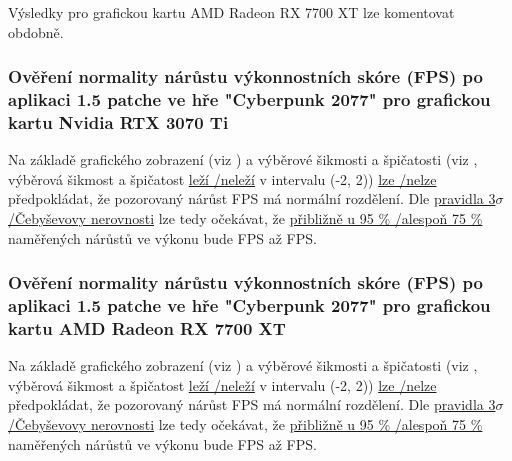 \vspace{1em}
\noindent
Výsledky pro grafickou kartu AMD Radeon RX 7700 XT lze komentovat obdobně.

\subsubsection*{Ověření normality nárůstu výkonnostních skóre (FPS) po aplikaci 1.5 patche ve hře "Cyberpunk 2077" pro grafickou kartu Nvidia RTX 3070 Ti}

Na základě grafického zobrazení (viz \TODO) a výběrové šikmosti a špičatosti (viz , výběrová šikmost a špičatost \ul{leží \slash neleží}
v intervalu (-2, 2)) \ul{lze \slash nelze} předpokládat, že pozorovaný nárůst FPS má normální rozdělení. Dle \ul{pravidla 3$\sigma$ \slash Čebyševovy nerovnosti}
lze tedy očekávat, že \ul{přibližně u 95 \% \slash alespoň 75 \%} naměřených nárůstů ve výkonu bude  FPS až  FPS\@.

\subsubsection*{Ověření normality nárůstu výkonnostních skóre (FPS) po aplikaci 1.5 patche ve hře "Cyberpunk 2077" pro grafickou kartu AMD Radeon RX 7700 XT}

Na základě grafického zobrazení (viz \TODO) a výběrové šikmosti a špičatosti (viz , výběrová šikmost a špičatost \ul{leží \slash neleží}
v intervalu (-2, 2)) \ul{lze \slash nelze} předpokládat, že pozorovaný nárůst FPS má normální rozdělení. Dle \ul{pravidla 3$\sigma$ \slash Čebyševovy nerovnosti}
lze tedy očekávat, že \ul{přibližně u 95 \% \slash alespoň 75 \%} naměřených nárůstů ve výkonu bude  FPS až  FPS\@.

\endinput